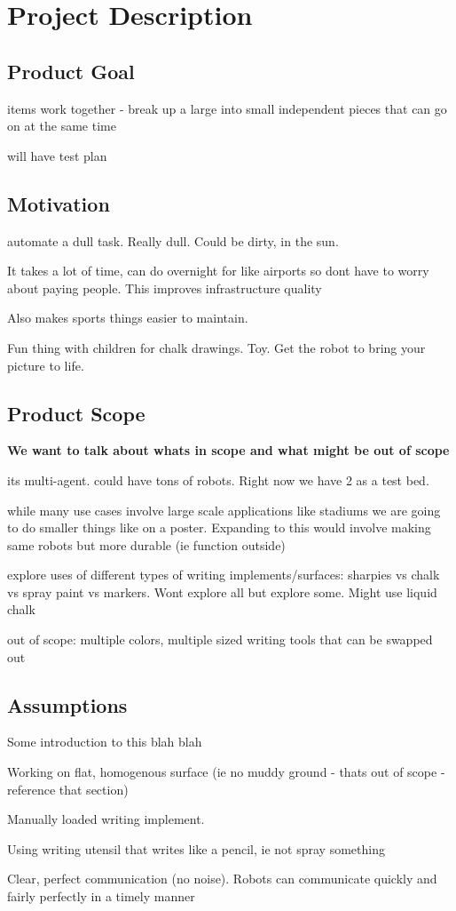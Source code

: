 
\section{Project Description}
\label{sec:project_description}

\subsection{Product Goal}
items work together - break up a large into small independent pieces that can go on at the same time

will have test plan

\subsection{Motivation}
automate a dull task. Really dull. Could be dirty, in the sun. 

It takes a lot of time, can do overnight for like airports so dont have to worry about paying people. This improves infrastructure quality

Also makes sports things easier to maintain.

Fun thing with children for chalk drawings. Toy. Get the robot to bring your picture to life. 

\subsection{Product Scope}
\textbf{We want to talk about whats in scope and what might be out of scope}

its multi-agent. could have tons of robots. Right now we have 2 as a test bed. 

while many use cases involve large scale applications like stadiums we are going to do smaller things like on a poster. Expanding to this would involve making same robots but more durable (ie function outside)

explore uses of different types of writing implements/surfaces: sharpies vs chalk vs spray paint vs markers. Wont explore all but explore some. Might use liquid chalk

out of scope: multiple colors, multiple sized writing tools that can be swapped out

\subsection{Assumptions}
Some introduction to this blah blah
\begin{list}{A:~}{}
\item Working on flat, homogenous surface (ie no muddy ground - thats out of scope - reference that section)
\item Manually loaded writing implement. 
\item Using writing utensil that writes like a pencil, ie not spray something
\item Clear, perfect communication (no noise). Robots can communicate quickly and fairly perfectly in a timely manner
\end{list}

